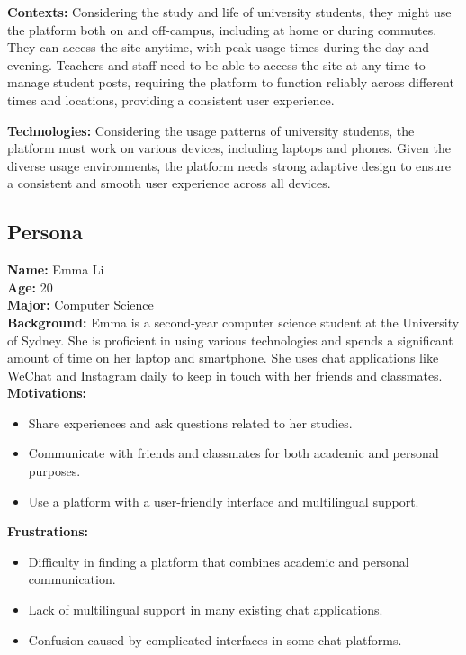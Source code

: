 \documentclass[12pt]{article}
\begin{document}
\textbf{Contexts:} Considering the study and life of university students, they might use the platform both on and off-campus, including at home or during commutes. They can access the site anytime, with peak usage times during the day and evening. Teachers and staff need to be able to access the site at any time to manage student posts, requiring the platform to function reliably across different times and locations, providing a consistent user experience.

\textbf{Technologies:} Considering the usage patterns of university students, the platform must work on various devices, including laptops and phones. Given the diverse usage environments, the platform needs strong adaptive design to ensure a consistent and smooth user experience across all devices.

\subsection{Persona}
\textbf{Name:} Emma Li \\
\textbf{Age:} 20 \\
\textbf{Major:} Computer Science \\
\textbf{Background:} Emma is a second-year computer science student at the University of Sydney. She is proficient in using various technologies and spends a significant amount of time on her laptop and smartphone. She uses chat applications like WeChat and Instagram daily to keep in touch with her friends and classmates. \\
\textbf{Motivations:} 
\begin{itemize}
    \item Share experiences and ask questions related to her studies.
    \item Communicate with friends and classmates for both academic and personal purposes.
    \item Use a platform with a user-friendly interface and multilingual support.
\end{itemize}

\textbf{Frustrations:} 
\begin{itemize}
    \item Difficulty in finding a platform that combines academic and personal communication.
    \item Lack of multilingual support in many existing chat applications.
    \item Confusion caused by complicated interfaces in some chat platforms.
\end{itemize}
\end{document}
